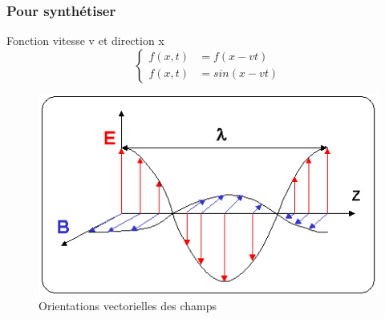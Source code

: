 \documentclass{beamer}
\begin{document}
\begin{frame}
	\frametitle{Pour synthétiser}
	Fonction vitesse v et direction x $$\begin{cases}f(x,t)&=f(x-vt)\\f(x,t)&=sin(x-vt)\end{cases}$$
	\begin{figure}
		\centering
		\includegraphics[scale=0.4]{OndeEM.png}
		\caption{Orientations vectorielles des champs}
	\end{figure}
\end{frame}
\end{document}
